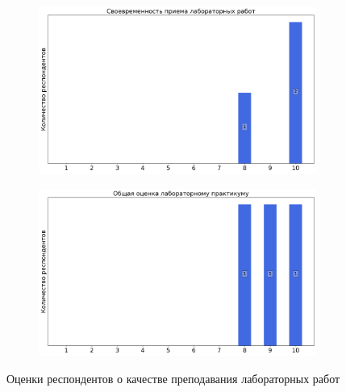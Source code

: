 \begin{figure}[H]
\begin{subfigure}[b]{0.45\textwidth}
				\includegraphics[width=\textwidth]{images/2 course/Общая физика - электричество и магнетизм/labniks-marks-Стрижак А.О.-2.png}
			\end{subfigure}
			\begin{subfigure}[b]{0.45\textwidth}
				\centering
				\includegraphics[width=\textwidth]{images/2 course/Общая физика - электричество и магнетизм/labniks-marks-Стрижак А.О.-3.png}
			\end{subfigure}	
			\caption{Оценки респондентов о качестве преподавания лабораторных работ}
		\end{figure}


